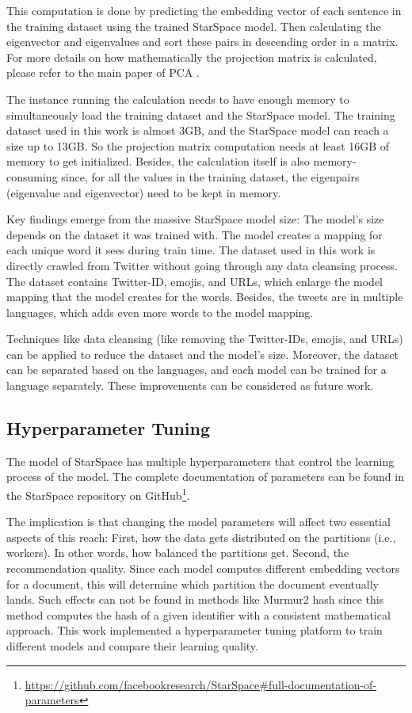 This computation is done by predicting the embedding vector of each sentence in the training dataset using the trained StarSpace model. Then calculating the eigenvector and eigenvalues and sort these pairs in descending order in a matrix. For more details on how mathematically the projection matrix is calculated, please refer to the main paper of PCA \cite{woldPrincipalComponentAnalysis1987}.


The instance running the calculation needs to have enough memory to simultaneously load the training dataset and the StarSpace model. The training dataset used in this work is almost 3GB, and the StarSpace model can reach a size up to 13GB. So the projection matrix computation needs at least 16GB of memory to get initialized. Besides, the calculation itself is also memory-consuming since, for all the values in the training dataset, the eigenpairs (eigenvalue and eigenvector) need to be kept in memory.


Key findings emerge from the massive StarSpace model size: The model's size depends on the dataset it was trained with. The model creates a mapping for each unique word it sees during train time. The dataset used in this work is directly crawled from Twitter without going through any data cleansing process. The dataset contains Twitter-ID, emojis, and URLs, which enlarge the model mapping that the model creates for the words. Besides, the tweets are in multiple languages, which adds even more words to the model mapping.


Techniques like data cleansing (like removing the Twitter-IDs, emojis, and URLs) can be applied to reduce the dataset and the model's size. Moreover, the dataset can be separated based on the languages, and each model can be trained for a language separately. These improvements can be considered as future work.


\subsection{Hyperparameter Tuning}
\label{subsec:hyperparameter-tuning}
The model of StarSpace has multiple hyperparameters that control the learning process of the model. The complete documentation of parameters can be found in the StarSpace repository on GitHub\footnote{\url{https://github.com/facebookresearch/StarSpace\#full-documentation-of-parameters}}. 


The implication is that changing the model parameters will affect two essential aspects of this reach: First, how the data gets distributed on the partitions (i.e., workers). In other words, how balanced the partitions get. Second, the recommendation quality. Since each model computes different embedding vectors for a document, this will determine which partition the document eventually lands. Such effects can not be found in methods like Murmur2 hash since this method computes the hash of a given identifier with a consistent mathematical approach. This work implemented a hyperparameter tuning platform to train different models and compare their learning quality.


